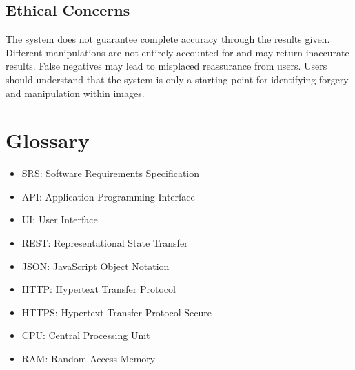 \documentclass{scrreprt}
\begin{document}
\section{Ethical Concerns}
The system does not guarantee complete accuracy through the results given. Different manipulations are not entirely accounted for and may return inaccurate results. False negatives may lead to misplaced reassurance from users. Users should understand that the system is only a starting point for identifying forgery and manipulation within images.


\chapter{Glossary}
\begin{itemize}
\item{SRS: Software Requirements Specification}
\item{API: Application Programming Interface}
\item{UI: User Interface}
\item{REST: Representational State Transfer}
\item{JSON: JavaScript Object Notation}
\item{HTTP: Hypertext Transfer Protocol}
\item{HTTPS: Hypertext Transfer Protocol Secure}
\item{CPU: Central Processing Unit}
\item{RAM: Random Access Memory}
\end{itemize}
\end{document}
